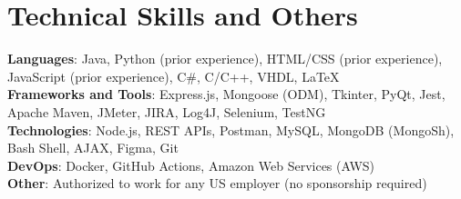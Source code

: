 \section{Technical Skills and Others}
    \begin{itemize}[leftmargin=0.15in, label={}]
	\small{\item{
	\textbf{Languages}{: Java, Python (prior experience), HTML/CSS (prior experience), JavaScript (prior experience), C\#, C/C++, VHDL, LaTeX} \\
		\textbf{Frameworks and Tools}{: Express.js, Mongoose (ODM), Tkinter, PyQt, Jest, Apache Maven, JMeter, JIRA, Log4J, Selenium, TestNG} \\
		\textbf{Technologies}{: Node.js, REST APIs, Postman, MySQL, MongoDB (MongoSh), Bash Shell, AJAX, Figma, Git} \\
		\textbf{DevOps}{: Docker, GitHub Actions, Amazon Web Services (AWS)} \\
            \textbf{Other}{: Authorized to work for any US employer (no sponsorship required)}
	}}
    \end{itemize}
